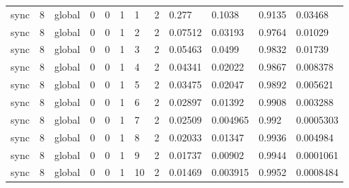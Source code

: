 \begin{tabular}{llllllllllll}
sync & 8 & global & 0 & 0 & 1 & 1 & 2 & 0.277 & 0.1038 & 0.9135 & 0.03468 \\
sync & 8 & global & 0 & 0 & 1 & 2 & 2 & 0.07512 & 0.03193 & 0.9764 & 0.01029 \\
sync & 8 & global & 0 & 0 & 1 & 3 & 2 & 0.05463 & 0.0499 & 0.9832 & 0.01739 \\
sync & 8 & global & 0 & 0 & 1 & 4 & 2 & 0.04341 & 0.02022 & 0.9867 & 0.008378 \\
sync & 8 & global & 0 & 0 & 1 & 5 & 2 & 0.03475 & 0.02047 & 0.9892 & 0.005621 \\
sync & 8 & global & 0 & 0 & 1 & 6 & 2 & 0.02897 & 0.01392 & 0.9908 & 0.003288 \\
sync & 8 & global & 0 & 0 & 1 & 7 & 2 & 0.02509 & 0.004965 & 0.992 & 0.0005303 \\
sync & 8 & global & 0 & 0 & 1 & 8 & 2 & 0.02033 & 0.01347 & 0.9936 & 0.004984 \\
sync & 8 & global & 0 & 0 & 1 & 9 & 2 & 0.01737 & 0.00902 & 0.9944 & 0.0001061 \\
sync & 8 & global & 0 & 0 & 1 & 10 & 2 & 0.01469 & 0.003915 & 0.9952 & 0.0008484 \\
\hline
\end{tabular}
